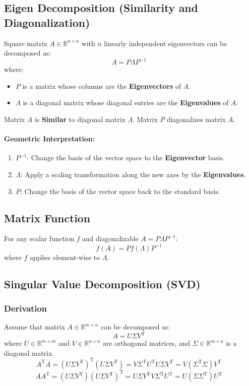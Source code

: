 \documentclass{article}
\begin{document}
\subsection{Eigen Decomposition (Similarity and Diagonalization)}

Square matrix $A \in \mathbb{R}^{n \times n}$ with $n$ linearly independent eigenvectors can be decomposed as:
\[
    A = P \Lambda P ^{-1}
\]
where:
\begin{itemize}
    \item $P$ is a matrix whose columns are the \textbf{Eigenvectors} of $A$.
    \item $\Lambda$ is a diagonal matrix whose diagonal entries are the \textbf{Eigenvalues} of $A$.
\end{itemize}
Matrix $A$ is \textbf{Similar} to diagonal matrix $\Lambda$.
\newline
Matrix $P$ diagonalizes matrix $A$.
\paragraph{Geometric Interpretation:}
\begin{enumerate}
    \item $P^{-1}$: Change the basis of the vector space to the \textbf{Eigenvector} basis.
    \item $\Lambda$: Apply a scaling transformation along the new axes by the \textbf{Eigenvalues}.
    \item $P$: Change the basis of the vector space back to the standard basis.
\end{enumerate}

\subsection{Matrix Function}

For any scalar function $f$ and diagonalizable $A = P \Lambda P^{-1}$:
\[
    f(A) = P f(\Lambda) P^{-1}
\]
where $f$ applies element-wise to $\Lambda$.

\subsection{Singular Value Decomposition (SVD)}

\subsubsection{Derivation}
Assume that matrix $A \in \mathbb{R}^{m \times n}$ can be decomposed as:
\[
    A = U \Sigma V^{\mathrm{T}}
\]
where $U \in \mathbb{R}^{m \times m}$ and $V \in \mathbb{R}^{n \times n}$ are orthogonal matrices, and $\Sigma \in \mathbb{R}^{m \times n}$ is a diagonal matrix.
\[
    A^{\mathrm{T}} A = (U \Sigma V^{\mathrm{T}})^{\mathrm{T}} (U \Sigma V^{\mathrm{T}}) = V \Sigma^{\mathrm{T}} U^{\mathrm{T}} U \Sigma V^{\mathrm{T}} = V (\Sigma^{\mathrm{T}} \Sigma) V^{\mathrm{T}}
\]
\[
    AA^{\mathrm{T}} = (U \Sigma V^{\mathrm{T}})(U \Sigma V^{\mathrm{T}})^{\mathrm{T}} = U \Sigma V^{\mathrm{T}} V \Sigma^{\mathrm{T}} U^{\mathrm{T}} = U (\Sigma \Sigma^{\mathrm{T}}) U^{\mathrm{T}}
\]
\end{document}
